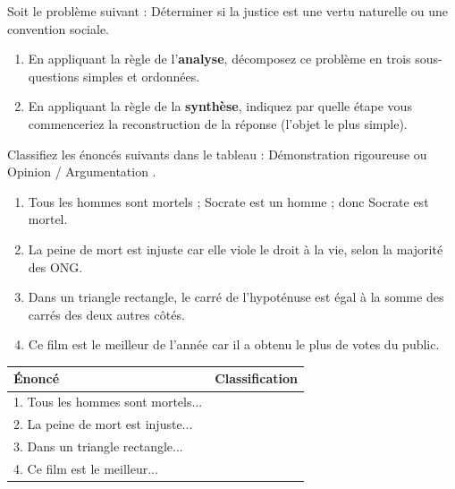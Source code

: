 \documentclass[11pt]{article}
\begin{document}
\begin{exercice}
Soit le problème suivant : \og Déterminer si la justice est une vertu naturelle ou une convention sociale. \fg
\begin{enumerate}
    \item En appliquant la règle de l'\textbf{analyse}, décomposez ce problème en trois sous-questions simples et ordonnées.
    \item En appliquant la règle de la \textbf{synthèse}, indiquez par quelle étape vous commenceriez la reconstruction de la réponse (l'objet le plus simple).
\end{enumerate}
\end{exercice}

\begin{exercice}
Classifiez les énoncés suivants dans le tableau : \og Démonstration rigoureuse \fg ou \og Opinion / Argumentation \fg.
\begin{enumerate}
    \item \og Tous les hommes sont mortels ; Socrate est un homme ; donc Socrate est mortel. \fg
    \item \og La peine de mort est injuste car elle viole le droit à la vie, selon la majorité des ONG. \fg
    \item \og Dans un triangle rectangle, le carré de l'hypoténuse est égal à la somme des carrés des deux autres côtés. \fg
    \item \og Ce film est le meilleur de l'année car il a obtenu le plus de votes du public. \fg
\end{enumerate}
\begin{center}
\begin{tabular}{|p{7cm}|c|}
\hline
\textbf{Énoncé} & \textbf{Classification} \\
\hline
1. Tous les hommes sont mortels... & \\
\hline
2. La peine de mort est injuste... & \\
\hline
3. Dans un triangle rectangle... & \\
\hline
4. Ce film est le meilleur... & \\
\hline
\end{tabular}
\end{center}
\end{exercice}
\end{document}
